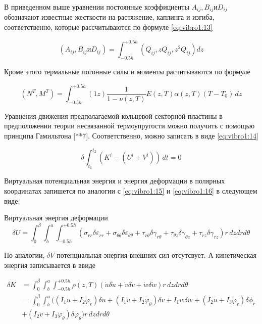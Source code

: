В приведенном выше уравнении постоянные коэффициенты \(A_{i j} , B_{i j} и D_{i j}\) обозначают известные жесткости на растяжение, каплинга и изгиба, соответственно, которые рассчитываются по формуле \cref{eq:vibro1:13}

\begin{equation}
	\label{eq:vibro2:10}
	\left ( A_{i j} , B_{i j} и D_{i j} \right ) = \int_{-0.5 h}^{+0.5h} \left ( Q_{i j} , zQ_{i j} , z^2 Q_{i j} \right ) dz
\end{equation}

Кроме этого термальные погонные силы и моменты расчитываются по формуле

\begin{equation}
	\label{eq:vibro2:11}
	\left ( N^T, M^T \right ) = \int_{-0.5 h}^{+0.5 h} \left ( 1 z \right ) \frac{1}{1-\nu(z, T)} E(z, T) \alpha(z, T) (T-T_0) \, dz
\end{equation}


Уравнения движения предполагаемой кольцевой секторной пластины в предположении теории несвязанной термоупругости можно получить с помощью принципа Гамильтона [**7].  Соответственно, можно записать в виде \cref{eq:vibro1:14}

\begin{equation}
	\label{eq:vibro2:12}
		\delta \int_{t_1}^{t_2} \left (K^i - \left ( U^i +V^i \right ) \right )\,dt = 0
\end{equation}


Виртуальная потенциальная энергия и энергия деформации в полярных координатах запишется по аналогии с \cref{eq:vibro1:15} и \cref{eq:vibro1:16} в следующем виде:

Виртуальная энергия деформации
\begin{equation}
	\label{eq:vibro2:13}
	\delta U = \int_0^{\beta} \int_b^{a}  \int_{-0.5h}^{+0.5h}  \left ( \sigma_{rr} \delta \varepsilon_{rr} + \sigma_{\theta \theta} \delta \varepsilon_{\theta \theta} +  \tau_{r \theta} \delta \gamma_{r \theta} + \tau_{\theta z} \delta \gamma_{\theta z} +  \tau_{r z} \delta \gamma_{r z} \right ) r\, dz dr d\theta
\end{equation}
 
По аналогии, \(\delta V\) потенциальная энергия внешних сил отсутсвует. А кинетическая энергия записывается в ввиде


\begin{equation}
	\label{eq:vibro2:14}
	\begin{split}
	\delta K &= \int_0^{\beta} \int_b^{a}  \int_{-0.5h}^{+0.5h}   \rho (z, T)  ( \dot{u} \delta \dot{u} +  \dot{v} \delta \dot{v} +  \dot{w} \delta \dot{w} )  r\, dz dr d\theta
	\\
	&=\int_0^{\beta} \int_b^{a}   (  (I_1 \ddot{u} + I_2 \ddot{\varphi}_r)\delta u +(I_1 \ddot{v} + I_2 \ddot{\varphi}_{\theta}) \delta v +I_1 \ddot{w} \delta w + (I_2 \ddot{u} + I_3 \ddot{\varphi}_r) \delta \phi_r
	\\
	 &+(I_2 \ddot{v} + I_3 \ddot{\varphi}_{\theta}) \delta \varphi_{\theta}  )  r\, dz dr d\theta
	\end{split}
\end{equation}

